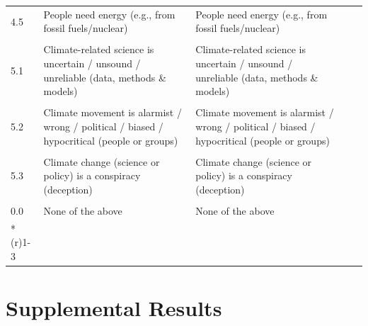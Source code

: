 \documentclass{article}
\begin{document}
\begin{longtable}{@{}lp{6.5cm}p{6.5cm}ll@{}}
4.5 &
  People need energy (e.g., from fossil fuels/nuclear) &
  People need energy (e.g., from fossil fuels/nuclear) &
   &
   \\ \\
5.1 &
  Climate-related science is uncertain / unsound / unreliable (data, methods \& models) &
  Climate-related science is uncertain / unsound / unreliable (data, methods \& models) &
   &
   \\ \\
5.2 &
  Climate movement is alarmist / wrong / political / biased / hypocritical (people or groups) &
  Climate movement is alarmist / wrong / political / biased / hypocritical (people or groups) &
   &
   \\ \\
5.3 &
  Climate change (science or policy) is a conspiracy (deception) &
  Climate change (science or policy) is a conspiracy (deception) &
   &
   \\ \\
0.0 &
  None of the above &
  None of the above &
   &
   \\* \cmidrule(r){1-3}
\end{longtable}


\pagebreak
\section{Supplemental Results}
\label{sec:detailed_results}
\end{document}
